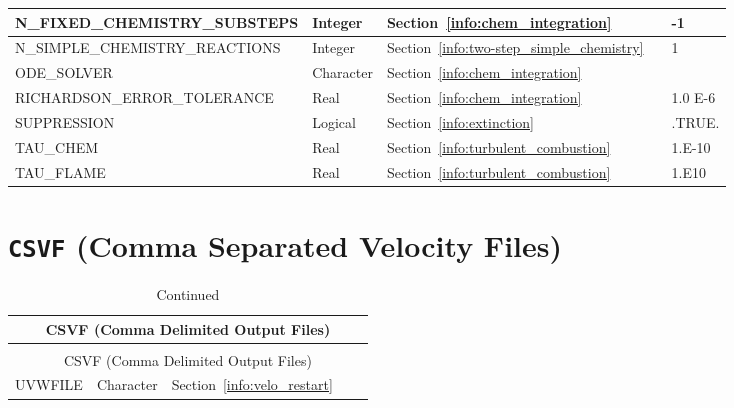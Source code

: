 \documentclass[11pt]{book}
\begin{document}
\begin{longtable}{@{\extracolsep{\fill}}|l|l|l|l|l|}
{\ct N\_FIXED\_CHEMISTRY\_SUBSTEPS}             & Integer       & Section~\ref{info:chem_integration}                   &               & -1                   \\ \hline
{\ct N\_SIMPLE\_CHEMISTRY\_REACTIONS}           & Integer       & Section~\ref{info:two-step_simple_chemistry}          &               & 1                    \\ \hline
{\ct ODE\_SOLVER}                               & Character     & Section~\ref{info:chem_integration}                   &               &                      \\ \hline
{\ct RICHARDSON\_ERROR\_TOLERANCE}              & Real          & Section~\ref{info:chem_integration}                   &               & 1.0 E-6              \\ \hline
{\ct SUPPRESSION}                               & Logical       & Section~\ref{info:extinction}                         &               & {\ct .TRUE.}         \\ \hline
{\ct TAU\_CHEM}                                 & Real          & Section~\ref{info:turbulent_combustion}               &               & 1.E-10               \\ \hline
{\ct TAU\_FLAME}                                & Real          & Section~\ref{info:turbulent_combustion}               &               & 1.E10                \\ \hline
\end{longtable}

\vspace{\baselineskip}



\section{\texorpdfstring{{\tt CSVF}}{CSVF} (Comma Separated Velocity Files)}

\begin{longtable}{@{\extracolsep{\fill}}|l|l|l|l|l|}
\caption[Comma separated velocity files ({\ct CSVF} namelist group)]{For more information see Section~\ref{info:CSVF}.}
\label{tbl:CSVF} \\
\hline
\multicolumn{5}{|c|}{{\ct CSVF} (Comma Delimited Output Files)} \\
\hline \hline
\endfirsthead
\caption[]{Continued} \\
\hline
\multicolumn{5}{|c|}{{\ct CSVF} (Comma Delimited Output Files)} \\
\hline \hline
\endhead
{\ct UVWFILE}         & Character      & Section~\ref{info:velo_restart}      &            &     \\ \hline
\end{longtable}
\end{document}
